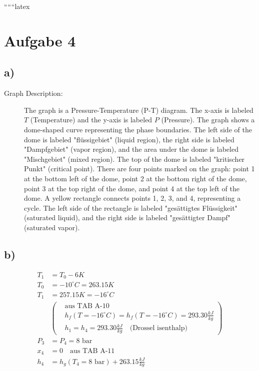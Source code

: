 
``````latex


\section*{Aufgabe 4}

\subsection*{a)}

\begin{description}
    \item[Graph Description:] The graph is a Pressure-Temperature (P-T) diagram. The x-axis is labeled $T$ (Temperature) and the y-axis is labeled $P$ (Pressure). The graph shows a dome-shaped curve representing the phase boundaries. The left side of the dome is labeled "flüssigebiet" (liquid region), the right side is labeled "Dampfgebiet" (vapor region), and the area under the dome is labeled "Mischgebiet" (mixed region). The top of the dome is labeled "kritischer Punkt" (critical point). There are four points marked on the graph: point 1 at the bottom left of the dome, point 2 at the bottom right of the dome, point 3 at the top right of the dome, and point 4 at the top left of the dome. A yellow rectangle connects points 1, 2, 3, and 4, representing a cycle. The left side of the rectangle is labeled "gesättigtes Flüssigkeit" (saturated liquid), and the right side is labeled "gesättigter Dampf" (saturated vapor).
\end{description}

\subsection*{b)}

\begin{align*}
    T_1 &= T_0 - 6K \\
    T_0 &= -10^\circ C = 263.15K \\
    T_1 &= 257.15K = -16^\circ C \\
    &\left( 
    \begin{aligned}
        &\text{aus TAB A-10} \\
        &h_f (T = -16^\circ C) = h_f (T = -16^\circ C) = 293.30 \frac{kJ}{kg} \\
        &h_1 = h_4 = 293.30 \frac{kJ}{kg} \quad \text{(Drossel isenthalp)}
    \end{aligned}
    \right) \\
    P_3 &= P_4 = 8 \text{ bar} \\
    x_4 &= 0 \quad \text{aus TAB A-11} \\
    h_4 &= h_g (T_4 = 8 \text{ bar}) + 263.15 \frac{kJ}{kg}
\end{align*}

